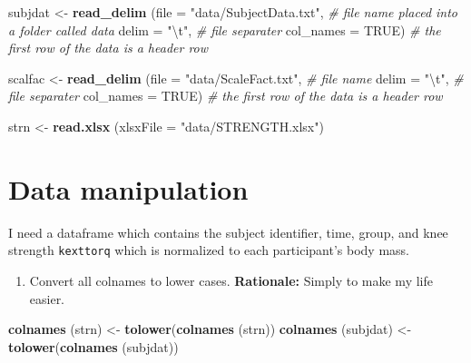 \documentclass[
]{book}
\newenvironment{Shaded}{\begin{snugshade}}{\end{snugshade}}
\newcommand{\CharTok}[1]{\textcolor[rgb]{0.31,0.60,0.02}{#1}}
\newcommand{\CommentTok}[1]{\textcolor[rgb]{0.56,0.35,0.01}{\textit{#1}}}
\newcommand{\DataTypeTok}[1]{\textcolor[rgb]{0.13,0.29,0.53}{#1}}
\newcommand{\KeywordTok}[1]{\textcolor[rgb]{0.13,0.29,0.53}{\textbf{#1}}}
\newcommand{\NormalTok}[1]{#1}
\newcommand{\OtherTok}[1]{\textcolor[rgb]{0.56,0.35,0.01}{#1}}
\newcommand{\StringTok}[1]{\textcolor[rgb]{0.31,0.60,0.02}{#1}}
\providecommand{\tightlist}{%
  \setlength{\itemsep}{0pt}\setlength{\parskip}{0pt}}
\begin{document}
\begin{Shaded}
\begin{Highlighting}[]
\NormalTok{subjdat <-}\StringTok{  }\KeywordTok{read_delim}\NormalTok{ (}\DataTypeTok{file =} \StringTok{"data/SubjectData.txt"}\NormalTok{, }\CommentTok{# file name placed into a folder called data}
                        \DataTypeTok{delim =} \StringTok{"}\CharTok{\textbackslash{}t}\StringTok{"}\NormalTok{, }\CommentTok{# file separater}
                        \DataTypeTok{col_names =} \OtherTok{TRUE}\NormalTok{) }\CommentTok{# the first row of the data is a header row}

\NormalTok{scalfac <-}\StringTok{  }\KeywordTok{read_delim}\NormalTok{ (}\DataTypeTok{file =} \StringTok{"data/ScaleFact.txt"}\NormalTok{, }\CommentTok{# file name}
                        \DataTypeTok{delim =} \StringTok{"}\CharTok{\textbackslash{}t}\StringTok{"}\NormalTok{, }\CommentTok{# file separater}
                        \DataTypeTok{col_names =} \OtherTok{TRUE}\NormalTok{) }\CommentTok{# the first row of the data is a header row}

\NormalTok{strn <-}\StringTok{  }\KeywordTok{read.xlsx}\NormalTok{ (}\DataTypeTok{xlsxFile =} \StringTok{"data/STRENGTH.xlsx"}\NormalTok{)}
\end{Highlighting}
\end{Shaded}

\hypertarget{data-manipulation}{%
\section{Data manipulation}\label{data-manipulation}}

I need a dataframe which contains the subject identifier, time, group, and knee strength \texttt{kexttorq} which is normalized to each participant's body mass.

\begin{enumerate}
\def\labelenumi{\arabic{enumi}.}
\tightlist
\item
  Convert all colnames to lower cases. \textbf{Rationale:} Simply to make my life easier.
\end{enumerate}

\begin{Shaded}
\begin{Highlighting}[]
\KeywordTok{colnames}\NormalTok{ (strn) <-}\StringTok{  }\KeywordTok{tolower}\NormalTok{(}\KeywordTok{colnames}\NormalTok{ (strn))}
\KeywordTok{colnames}\NormalTok{ (subjdat) <-}\StringTok{  }\KeywordTok{tolower}\NormalTok{(}\KeywordTok{colnames}\NormalTok{ (subjdat))}
\end{Highlighting}
\end{Shaded}
\end{document}
